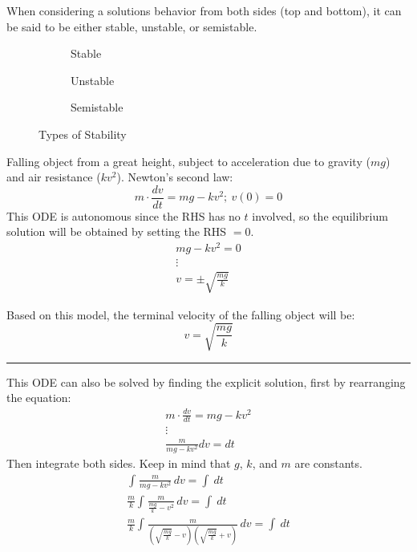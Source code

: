 \documentclass[12pt]{article}
\begin{document}
When considering a solutions behavior from both sides (top and bottom), it can be said to be either stable, unstable, or semistable.

\begin{figure}[H]
  \centering
  \begin{subfigure}[H]{0.30\textwidth}
    \centering
    
    \caption{Stable}
    \label{fig:006}
  \end{subfigure}
  \begin{subfigure}[H]{0.30\textwidth}
    \centering
    
    \caption{Unstable}
    \label{fig:007}
  \end{subfigure}
  \begin{subfigure}[H]{0.30\textwidth}
    \centering
    
    \caption{Semistable}
    \label{fig:008}
  \end{subfigure}
  \caption{Types of Stability}
  \label{fig:typesOfStability}
\end{figure}

\begin{example}
  Falling object from a great height, subject to acceleration due to gravity ($mg$) and air resistance ($kv^2$). Newton's second law:
  \begin{equation*}
    m \cdot \frac{dv}{dt} = mg - kv^2;\ v(0) = 0
  \end{equation*}
  This ODE is autonomous since the RHS has no $t$ involved, so the equilibrium solution will be obtained by setting the RHS $= 0$.
  \begin{gather*}
    mg-kv^2 = 0 \\
    \vdots \\
    v = \pm \sqrt{\frac{mg}{k}}
  \end{gather*}

  Based on this model, the terminal velocity of the falling object will be:
  \begin{equation*}
    v = \sqrt{\frac{mg}{k}}
  \end{equation*}
  \hrule
  \vspace{12pt}
  This ODE can also be solved by finding the explicit solution, first by rearranging the equation:
  \begin{gather*}
    m \cdot \frac{dv}{dt} = mg - kv^2 \\
    \vdots \\
    \frac{m}{mg-kv^2}dv = dt
  \end{gather*}
  Then integrate both sides. Keep in mind that $g$, $k$, and $m$ are constants.
  \begin{gather*}
    \int_{}^{} \frac{m}{mg-kv^2} \,dv = \int_{}^{}  \,dt \\
    \frac{m}{k}\int_{}^{} \frac{m}{\frac{mg}{k}-v^2} \,dv = \int_{}^{}  \,dt \\
    \frac{m}{k}\int_{}^{} \frac{m}{\left(\sqrt{\frac{mg}{k}}-v\right)\left(\sqrt{\frac{mg}{k}}+v\right)} \,dv = \int_{}^{}  \,dt \\
  \end{gather*}
\end{example}
\end{document}
